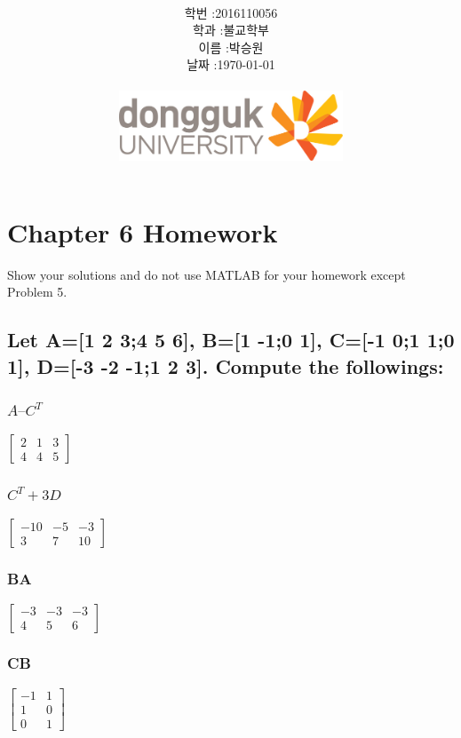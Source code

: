 \documentclass[12pt,a4paper]{article}
\title{
	\centering
	\pgfornament[width=12cm,color=teal]{84}\\
	\vspace{1cm}
	\fontsize{50}{50} \selectfont {정보통신 수학 및 실습\\Homework}\\
		\pgfornament[width=12cm,color=teal]{88}\\
	\vfill}
\author{
	\LARGE
	\begin{tabular}{rl}
		\hline
		학번 : & 2016110056\\ 
		학과 : & 불교학부 \\
		이름 : & 박승원\\
		날짜 : & \today\\
		\hline
	\end{tabular}\vspace{2cm}
	\\
\includegraphics[width=0.5\textwidth]{logo.jpg}
	}
\date{}
\begin{document}
\maketitle
{}
\noindent
\lstset{language=matlab, columns=flexible, tabsize=4, frame=shadowbox, showstringspaces=false, breaklines=true, upquote=true, basicstyle=\normalsize}

\renewcommand{\thesubsubsection}{\alph{subsubsection})}
\renewcommand{\thesubsection}{\arabic{subsection}.}
\newpage

\section*{Chapter 6 Homework}
Show your solutions and do not use MATLAB for your homework except Problem 5.

\subsection{Let A=[1 2 3;4 5 6], B=[1 -1;0 1], C=[-1 0;1 1;0 1], D=[-3 -2 -1;1 2 3].  Compute the followings:} 

\subsubsection{$A – C^T$} 
$\begin{bmatrix}
	2&1&3\\
	4&4&5
\end{bmatrix}
$
\subsubsection{$C^T +3D$} 
$
\begin{bmatrix}
-10 &-5& -3\\3& 7& 10
\end{bmatrix}
$
\subsubsection{BA}
$
\begin{bmatrix}
-3&-3&-3\\4&5&6
\end{bmatrix}
$
\subsubsection{CB}
$
\begin{bmatrix}
-1&1\\1&0\\0&1
\end{bmatrix}
$
\end{document}
